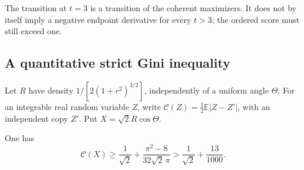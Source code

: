 The transition at \(t=3\) is a transition of the coherent maximizers.
It does not by itself imply a negative endpoint derivative for every
\(t>3\); the ordered score must still exceed one.

\subsection{A quantitative strict Gini inequality}

Let \(R\) have density \(1/[2(1+r^2)^{3/2}]\), independently of a
uniform angle \(\Theta\). For an integrable real random variable \(Z\),
write \(\mathcal C(Z)=\tfrac12\mathbb E|Z-Z'|\), with an independent
copy \(Z'\). Put \(X=\sqrt2R\cos\Theta\).

\begin{lemma}\label{mf:strong-gini}
One has
\begin{equation}\label{mf:gini-gain}
 \mathcal C(X)\ge\frac1{\sqrt2}
             +\frac{\pi^2-8}{32\sqrt2\,\pi}
             >\frac1{\sqrt2}+\frac{13}{1000}.
\end{equation}
\end{lemma}
